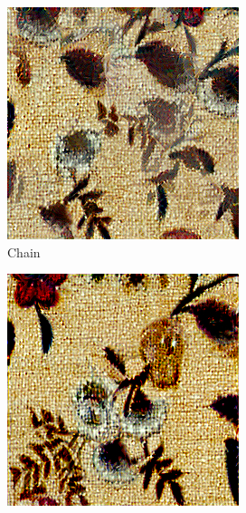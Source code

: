\begin{figure}[ht]
\begin{subfigure}{0.8\textwidth}
        \begin{subfigure}{0.32\textwidth}
            \centering
            \includegraphics[width=\textwidth]{images/03-comparison_small_chain.jpg}
            \caption{Chain}
            \label{fig:methods_comparison_small-chain}
        \end{subfigure}
        \hfill
        \begin{subfigure}{0.32\textwidth}
            \centering
            \includegraphics[width=\textwidth]{images/03-comparison_small_pyramid.jpg}

\end{subfigure}
\end{subfigure}
\end{figure}
